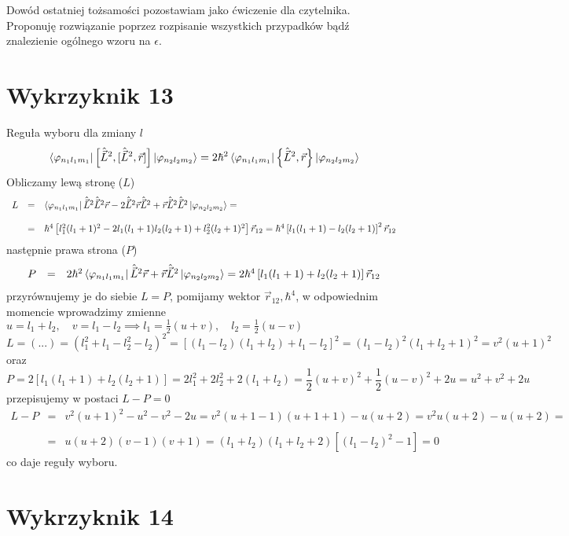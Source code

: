 \documentclass[a4paper,12pt]{article}
\begin{document}
Dowód ostatniej tożsamości pozostawiam jako ćwiczenie dla czytelnika. Proponuję
rozwiązanie poprzez rozpisanie wszystkich przypadków bądź znalezienie ogólnego
wzoru na $\epsilon$.
\section{Wykrzyknik 13}
Reguła wyboru dla zmiany $l$
$$
	\bra{\varphi_{n_1l_1m_1}}\left[\hat{\vec{L}}^2,[\hat{\vec{L}}^2,\vec{r}]\right]\ket{\varphi_{n_2l_2m_2}} = 2\hbar^2\bra{\varphi_{n_1l_1m_1}}\left\{\hat{\vec{L}}^2,\vec{r}\right\} \ket{\varphi_{n_2l_2m_2}}
$$
Obliczamy lewą stronę ($L$)
$$
\begin{array}{lll}
	L &=& \bra{\varphi_{n_1l_1m_1}} \hat{\vec{L}}^2 \hat{\vec{L}}^2\vec{r}- 2\hat{\vec{L}}^2\vec{r}\hat{\vec{L}}^2+\vec{r}\hat{\vec{L}}^2\hat{\vec{L}}^2\ket{\varphi_{n_2l_2m_2}} =\\\\
	&=& \hbar^4\left[l_1^2(l_1+1)^2-2l_1(l_1+1)l_2(l_2+1)+l_2^2(l_2+1)^2 \right]\vec{r}_{12} = \hbar^4\left[l_1(l_1+1)-l_2(l_2+1)\right]^2\vec{r}_{12}
\end{array}
$$
następnie prawa strona ($P$)
$$
\begin{array}{lll}
	P &=& 2\hbar^2\bra{\varphi_{n_1l_1m_1}}\hat{\vec{L}}^2\vec{r}+\vec{r}\hat{\vec{L}}^2\ket{\varphi_{n_2l_2m_2}} = 2\hbar^4\left[l_1(l_1+1)+l_2(l_2+1)\right]\vec{r}_{12}
\end{array}
$$
przyrównujemy je do siebie $L=P$, pomijamy wektor $\vec{r}_{12}, \hbar^4$, w odpowiednim momencie wprowadzimy zmienne $u = l_1+l_2,\quad v = l_1-l_2\implies l_1=\frac{1}{2}(u+v),\quad l_2 = \frac{1}{2}(u-v)$
$$
	L = (...) = (l_1^2+l_1-l_2^2-l_2)^2 = [(l_1-l_2)(l_1+l_2)+l_1-l_2]^2 = (l_1-l_2)^2 (l_1+l_2+1)^2 = v^2 (u+1)^2
$$
oraz
$$
	P = 2[l_1(l_1+1)+l_2(l_2+1)] = 2l_1^2+2l_2^2+2(l_1+l_2) = \frac{1}{2}(u+v)^2+\frac{1}{2}(u-v)^2+2u = u^2+v^2+2u
$$
przepisujemy w postaci $L-P=0$
$$
\begin{array}{lll}
	L-P &=& v^2(u+1)^2-u^2-v^2-2u = v^2(u+1-1)(u+1+1) - u(u+2) = v^2u(u+2)-u(u+2) =\\\\ &=& u(u+2)(v-1)(v+1) = (l_1+l_2)(l_1+l_2+2)[(l_1-l_2)^2-1] = 0
\end{array}
$$
co daje reguły wyboru.

\section{Wykrzyknik 14}
\end{document}
